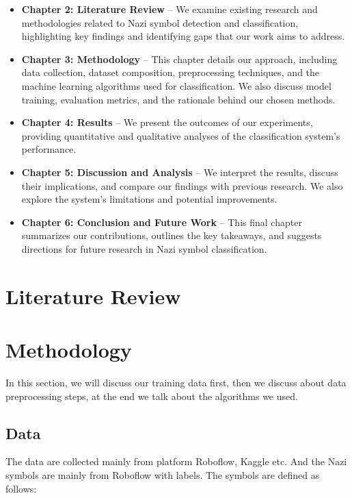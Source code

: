 \documentclass[11pt,a4paper,onecolumn]{article}
\begin{document}
\begin{itemize}
  \item \textbf{Chapter 2: Literature Review} – We examine existing
    research and methodologies related to Nazi symbol detection and
    classification, highlighting key findings and identifying gaps
    that our work aims to address.
  \item \textbf{Chapter 3: Methodology} – This chapter details our
    approach, including data collection, dataset composition,
    preprocessing techniques, and the machine learning algorithms
    used for classification. We also discuss model training,
    evaluation metrics, and the rationale behind our chosen methods.
  \item \textbf{Chapter 4: Results} – We present the outcomes of our
    experiments, providing quantitative and qualitative analyses of
    the classification system’s performance.
  \item \textbf{Chapter 5: Discussion and Analysis} – We interpret
    the results, discuss their implications, and compare our findings
    with previous research. We also explore the system's limitations
    and potential improvements.
  \item \textbf{Chapter 6: Conclusion and Future Work} – This final
    chapter summarizes our contributions, outlines the key takeaways,
    and suggests directions for future research in Nazi symbol classification.
\end{itemize}

\section{Literature Review}

\section{Methodology}
In this section, we will discuss our training data first, then we
discuss about data preprocessing steps, at the end we talk about the
algorithms we used.

\subsection{Data}

The data are collected mainly from platform Roboflow, Kaggle etc. And the Nazi symbols
are mainly from Roboflow with labels. The symbols are defined as follows:
\end{document}
